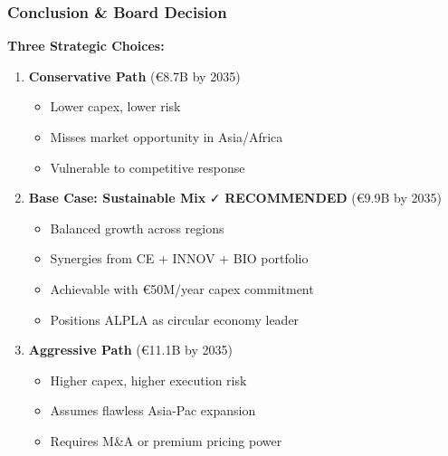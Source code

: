 \documentclass[aspectratio=169,12pt,xcolor=dvipsnames]{beamer}
\newcommand{\highlight}[1]{{\color{alpla_blue}\textbf{#1}}}
\begin{document}
\begin{frame}
  \frametitle{Conclusion \& Board Decision}

  \textbf{\Large \highlight{Three Strategic Choices:}}

  \vspace{0.5cm}

  \begin{enumerate}

    \item \textbf{Conservative Path} (€8.7B by 2035)
    \begin{itemize}
      \item Lower capex, lower risk
      \item Misses market opportunity in Asia/Africa
      \item Vulnerable to competitive response
    \end{itemize}

    \vspace{0.4cm}

    \item \textbf{Base Case: Sustainable Mix} ✓ \highlight{RECOMMENDED} (€9.9B by 2035)
    \begin{itemize}
      \item Balanced growth across regions
      \item Synergies from CE + INNOV + BIO portfolio
      \item Achievable with €50M/year capex commitment
      \item Positions ALPLA as circular economy leader
    \end{itemize}

    \vspace{0.4cm}

    \item \textbf{Aggressive Path} (€11.1B by 2035)
    \begin{itemize}
      \item Higher capex, higher execution risk
      \item Assumes flawless Asia-Pac expansion
      \item Requires M\&A or premium pricing power
    \end{itemize}

  \end{enumerate}

\end{frame}

\end{document}
